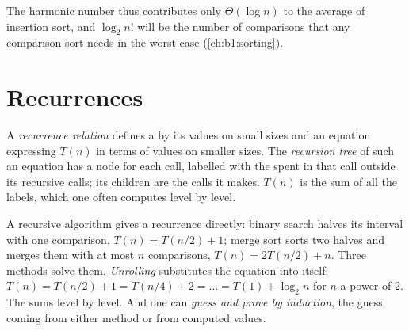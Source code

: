 The harmonic number thus contributes only $\Theta(\log n)$ to the average of insertion sort, and $\log_2 n!$ will be the
number of comparisons that any comparison sort needs in the worst case (\cref{ch:b1:sorting}).

\section{Recurrences}\label{sec:b1:asymptotic-analysis:recurrences}

\begin{definition}\label{def:b1:asymptotic-analysis:recurrence}
A \emph{recurrence relation} defines a  by its values on small sizes and an
equation expressing $T(n)$ in terms of values on smaller sizes. The \emph{recursion tree} of such
an equation has a node for each call, labelled with the  spent in that call outside its recursive calls; its
children are the calls it makes. $T(n)$ is the sum of all the labels, which one often computes level by level.
\end{definition}

A recursive algorithm gives a recurrence directly: binary search halves its interval with one comparison, $T(n) =
T(n/2) + 1$; merge sort sorts two halves and merges them with at most $n$ comparisons, $T(n) = 2T(n/2) + n$. Three
methods solve them. \emph{Unrolling} substitutes the equation into itself: $T(n) = T(n/2) + 1 = T(n/4) + 2 = \dots =
T(1) + \log_2 n$ for $n$ a power of 2. The \emph{} sums level by level. And one can \emph{guess and prove
by induction}, the guess coming from either method or from computed values.

